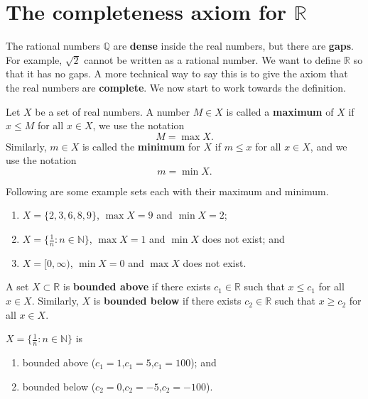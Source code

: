 \chapter{The completeness axiom for $\mathbb R$}

The rational numbers $\mathbb Q$ are \textbf{dense} inside the real numbers, but there are \textbf{gaps}. For example, $\sqrt 2$ cannot be written as a rational number. We want to define $\mathbb R$ so that it has no gaps. A more technical way to say this is to give the axiom that the real numbers are \textbf{complete}. We now start to work towards the definition.

\begin{definition}
    Let $X$ be a set of real numbers. A number $M\in X$ is called a \textbf{maximum} of $X$ if $x\leq M$ for all $x\in X$, we use the notation \[M=\max{X}.\] Similarly, $m\in X$ is called the \textbf{minimum} for $X$ if $m\leq x$ for all $x\in X$, and we use the notation \[m=\min{X}.\] 
\end{definition}

\begin{example}
    Following are some example sets each with their maximum and minimum.
    \begin{enumerate}
        \item $X=\{2,3,6,8,9\}$, $\max{X}=9$ and $\min{X}=2$;
        \item $X=\{\frac1n:n\in\mathbb N\}$, $\max{X}=1$ and $\min{X}$ does not exist; and 
        \item $X=[0,\infty)$, $\min{X}=0$ and $\max{X}$ does not exist.
    \end{enumerate}
\end{example}

\begin{definition}
    A set $X\subset\mathbb R$ is \textbf{bounded above} if there exists $c_1\in\mathbb R$ such that $x\leq c_1$ for all $x\in X$. Similarly, $X$ is \textbf{bounded below} if there exists $c_2\in\mathbb R$ such that $x\geq c_2$ for all $x\in X$.
\end{definition}

\begin{example}
    $X=\{\frac1n:n\in\mathbb N\}$ is 
    \begin{enumerate}
        \item bounded above ($c_1=1$,$c_1=5$,$c_1=100$); and
        \item bounded below ($c_2=0$,$c_2=-5$,$c_2=-100$).
    \end{enumerate}
\end{example}

